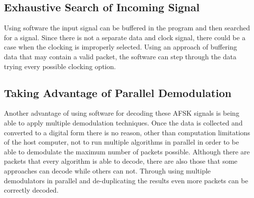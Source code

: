 \subsection{Exhaustive Search of Incoming Signal}
Using software the input signal can be buffered in the program and then searched for a signal. Since there is not a separate data and clock signal, there could be a case when the clocking is improperly selected. Using an approach of buffering data that may contain a valid packet, the software can step through the data trying every possible clocking option.

\subsection{Taking Advantage of Parallel Demodulation}
Another advantage of using software for decoding these AFSK signals is being able to apply multiple demodulation techniques. Once the data is collected and converted to a digital form there is no reason, other than computation limitations of the host computer, not to run multiple algorithms in parallel in order to be able to demodulate the maximum number of packets possible. Although there are packets that every algorithm is able to decode, there are also those that some approaches can decode while others can not. Through using multiple demodulators in parallel and de-duplicating the results even more packets can be correctly decoded.